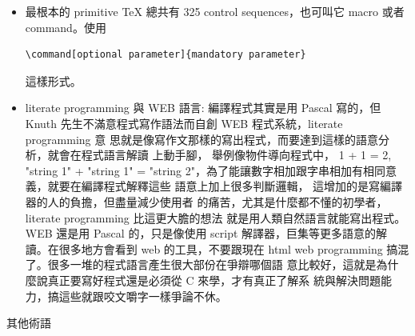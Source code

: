 \begin{itemize}
  \item 最根本的 primitive \TeX{} 總共有 325 control sequences，也可叫它
    macro 或者 command。使用
    \begin{verbatim}
\command[optional parameter]{mandatory parameter}
    \end{verbatim}
    這樣形式。
  \item literate programming 與 WEB 語言: 編譯程式其實是用 Pascal 寫的，但
    Knuth 先生不滿意程式寫作語法而自創 WEB 程式系統，literate programming 意
    思就是像寫作文那樣的寫出程式，而要達到這樣的語意分析，就會在程式語言解讀
    上動手腳， 舉例像物件導向程式中， 1 + 1 = 2, "string 1" + "string 1" =
    "string 2"，為了能讓數字相加跟字串相加有相同意義，就要在編譯程式解釋這些
    語意上加上很多判斷邏輯， 這增加的是寫編譯器的人的負擔，但盡量減少使用者
    的痛苦，尤其是什麼都不懂的初學者， literate programming 比這更大膽的想法
    就是用人類自然語言就能寫出程式。WEB 還是用 Pascal 的，只是像使用 script
    解譯器，巨集等更多語意的解讀。在很多地方會看到 web 的工具，不要跟現在
    html web programming 搞混了。很多一堆的程式語言產生很大部份在爭辯哪個語
    意比較好，這就是為什麼說真正要寫好程式還是必須從 C 來學，才有真正了解系
    統與解決問題能力，搞這些就跟咬文嚼字一樣爭論不休。
\end{itemize}
其他術語
